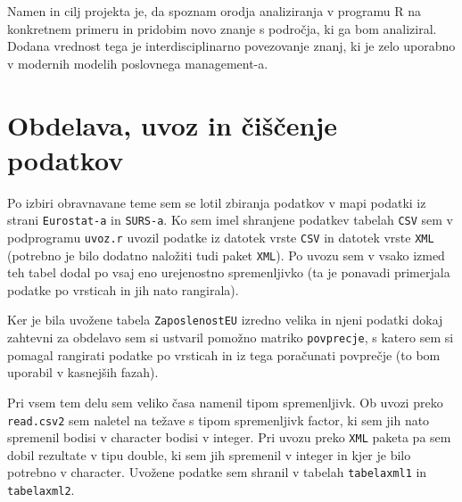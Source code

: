 \documentclass[11pt,a4paper]{article}
\begin{document}
Namen in cilj projekta je, da spoznam orodja analiziranja v programu R na konkretnem primeru in pridobim novo znanje s področja, ki ga bom analiziral. Dodana vrednost tega je interdisciplinarno povezovanje znanj, ki je zelo uporabno v modernih modelih poslovnega management-a. 
\pagebreak
\section{Obdelava, uvoz in čiščenje podatkov}

Po izbiri obravnavane teme sem se lotil zbiranja podatkov v mapi podatki iz strani \verb|Eurostat-a| in \verb|SURS-a|. Ko sem imel shranjene podatkev tabelah \verb|CSV| sem v podprogramu \verb|uvoz.r| uvozil podatke iz datotek vrste \verb|CSV| in datotek vrste \verb|XML| (potrebno je bilo dodatno naložiti tudi paket \verb|XML|). Po uvozu sem v vsako izmed teh tabel dodal po vsaj eno urejenostno spremenljivko (ta je ponavadi primerjala podatke po vrsticah in jih nato rangirala). 

Ker je bila uvožene tabela \verb|ZaposlenostEU| izredno velika in njeni podatki dokaj zahtevni za obdelavo sem si ustvaril pomožno matriko \verb|povprecje|, s katero sem si pomagal rangirati podatke po vrsticah in iz tega poračunati povprečje (to bom uporabil v kasnejših fazah). 

Pri vsem tem delu sem veliko časa namenil tipom spremenljivk. Ob uvozi preko \verb|read.csv2| sem naletel na težave s tipom spremenljivk factor, ki sem jih nato spremenil bodisi v character bodisi v integer. Pri uvozu preko \verb|XML| paketa pa sem dobil rezultate v tipu double, ki sem jih spremenil v integer in kjer je bilo potrebno v character. Uvožene podatke sem shranil v tabelah \verb|tabelaxml1| in \verb|tabelaxml2|. 
\end{document}
